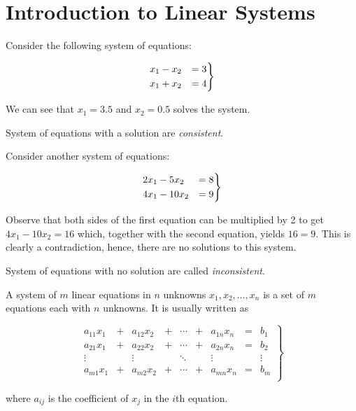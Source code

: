 
\section{Introduction to Linear Systems}
    \renewcommand{\leftmark}{August 09, 2023}

    \begin{example}
        Consider the following system of equations:

        \[\begin{rcases}
        x_1 - x_2 &= 3 \\
        x_1 + x_2 &= 4
        \end{rcases}\]

        We can see that \(x_1 = 3.5\) and \(x_2 = 0.5\) solves the system. 

    \end{example}

    \begin{note}
        System of equations with a solution are \emph{consistent}.
    \end{note}

    \begin{example}
        Consider another system of equations:

        \[\begin{rcases}
            2x_1 - 5x_2 &= 8 \\
            4x_1 - 10x_2 &= 9
        \end{rcases}\]

        Observe that both sides of the first equation can be multiplied by 2 to get \(4x_1 - 10x_2 = 16\) which, together with the second equation, yields \(16 = 9\). This is clearly a contradiction, hence, there are no solutions to this system.
    \end{example}

    \begin{note}
        System of equations with no solution are called \emph{inconsistent}.
    \end{note}

    \begin{dfn}
        A system of \(m\) linear equations in \(n\) unknowns \(x_1, x_2, \ldots, x_n\) is a set of \(m\) equations each with \(n\) unknowns. It is usually written as 

        \[\renewcommand{\arraystretch}{1.15}\left.\begin{array}{ccccccccc}
            a_{11}x_1 &+& a_{12}x_2 &+& \cdots &+& a_{1n}x_n &=& b_1 \\
            a_{21}x_1 &+& a_{22}x_2 &+& \cdots &+& a_{2n}x_n &=& b_2 \\
            \vdots &\phantom{+}& \vdots &\phantom{+}& \ddots &\phantom{+}& \vdots &\phantom{=}& \vdots \\
            a_{m1}x_1 &+& a_{m2}x_2 &+& \cdots &+& a_{mn}x_n &=& b_m \\
        \end{array}\right\}\]

        where \(a_{ij}\) is the coefficient of \(x_j\) in the \(i\)th equation.
    \end{dfn}

